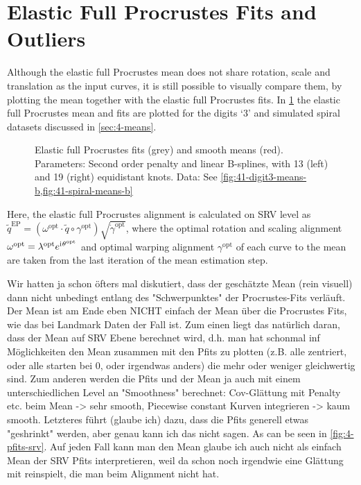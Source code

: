 \section{Elastic Full Procrustes Fits and Outliers}
\label{sec:4-pfits}
Although the elastic full Procrustes mean does not share rotation, scale and translation as the input curves, it is still possible to visually compare them, by plotting the mean together with the elastic full Procrustes fits.
In \cref{fig:4-pfits} the elastic full Procrustes mean and fits are plotted for the digits \enquote*{3} and simulated spiral datasets discussed in \cref{sec:4-means}.
\begin{figure}
  \centering
  \begin{subfigure}{0.48\textwidth}
  \end{subfigure}
  \begin{subfigure}{0.48\textwidth}
  \end{subfigure}
  \caption{Elastic full Procrustes fits (grey) and smooth means (red). Parameters: Second order penalty and linear B-splines, with 13 (left) and 19 (right) equidistant knots. Data: See \cref{fig:41-digit3-means-b,fig:41-spiral-means-b}}
  \label{fig:4-pfits}
\end{figure}
Here, the elastic full Procrustes alignment is calculated on SRV level as $\widetilde q^\mathrm{EP} = (\omega^\mathrm{opt}\cdot \widetilde q \circ \gamma^\mathrm{opt} ) \sqrt{\dot\gamma^\mathrm{opt}}$, where the optimal rotation and scaling alignment $\omega^\mathrm{opt} = \lambda^\mathrm{opt} e^{\mathrm{i}\mkern1mu \theta^\mathrm{opt}}$ and optimal warping alignment $\gamma^\mathrm{opt}$ of each curve to the mean are taken from the last iteration of the mean estimation step.


Wir hatten ja schon öfters mal diskutiert, dass der geschätzte Mean (rein visuell) dann nicht unbedingt entlang des "Schwerpunktes" der Procrustes-Fits verläuft.
Der Mean ist am Ende eben NICHT einfach der Mean über die Procrustes Fits, wie das bei Landmark Daten der Fall ist.
Zum einen liegt das natürlich daran, dass der Mean auf SRV Ebene berechnet wird, d.h. man hat schonmal inf Möglichkeiten den Mean zusammen mit den Pfits zu plotten (z.B. alle zentriert, oder alle starten bei 0, oder irgendwas anders) die mehr oder weniger gleichwertig sind.
Zum anderen werden die Pfits und der Mean ja auch mit einem unterschiedlichen Level an "Smoothness" berechnet: Cov-Glättung mit Penalty etc. beim Mean -> sehr smooth, Piecewise constant Kurven integrieren -> kaum smooth. 
Letzteres führt (glaube ich) dazu, dass die Pfits generell etwas "geshrinkt" werden, aber genau kann ich das nicht sagen. 
As can be seen in \cref{fig:4-pfits-srv}.
Auf jeden Fall kann man den Mean glaube ich auch nicht als einfach Mean der SRV Pfits interpretieren, weil da schon noch irgendwie eine Glättung mit reinspielt, die man beim Alignment nicht hat.

